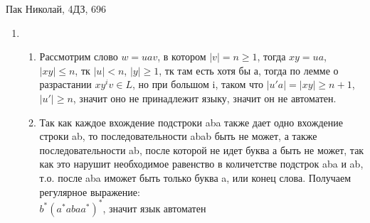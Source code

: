 \documentclass{article}
\begin{document}
\LARGE
	Пак Николай, 4ДЗ, 696\\
	\begin{enumerate}
		\item 
			\begin{enumerate}
				\item
				Рассмотрим слово $w = uav$, в котором $|v| = n \ge 1$, тогда $xy = ua$, $|xy| \le n$, тк $|u| < n$, $|y| \ge 1$, тк там есть хотя бы а,  тогда по лемме о разрастании $xy^iv \in L$, но при большом i, таком что $|u'a| = |xy| \ge n+1$, $|u'| \ge n$, значит оно не принадлежит языку, значит он не автоматен.\\ 	
				\item
					Так как каждое вхождение подстроки aba также дает одно вхождение строки ab, то последовательности abab быть не может, а также последовательности ab, после которой не идет буква а быть не может, так как это нарушит необходимое равенство в количетстве подстрок aba и ab, т.о. после aba иможет быть только буква a, или конец слова. Получаем регулярное выражение:\\
					$b^*(a^*abaa^*)^* $, значит язык автоматен 
			\end{enumerate}

	\end{enumerate}
 
\end{document}
